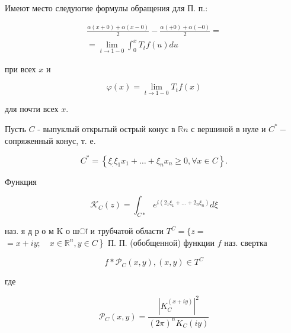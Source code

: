 \documentclass[10pt]{article}
\begin{document}
Имеют место следуюгие формулы обращения для П. п.:



\[

\begin{gathered}

\frac{\alpha(x+0)+\alpha(x-0)}{2}-\frac{\alpha(+0)+\alpha(-0)}{2}= \\

=\lim _{t \rightarrow 1-0} \int_{0}^{x} T_{t} f(u) d u

\end{gathered}

\]



при всех $x$ и



\[

\varphi(x)=\lim _{t \rightarrow 1-0} T_{t} f(x)

\]



для почти всех $x$.



Пусть $C$ - выпуклый открытый острый конус в $\mathbb{R} n$ с вершиной в нуле и $C^{*}-$ сопряженный конус, т. е.



\[

C^{*}=\left\{\xi_{:} \xi_{1} x_{1}+\ldots+\xi_{n} x_{n} \geqslant 0, \forall x \in C\right\} .

\]



Функция



\[

\mathscr{K}_{C}(z)=\int_{C *} e^{i\left(2_{1} \xi_{1}+\ldots+2_{n} \xi_{n}\right)} d \xi

\]



наз. я д р о м $\mathrm{K}$ о шा и трубчатой области $T^{C}=\{z=$ $\left.=x+i y ; \quad x \in \mathbb{R}^{n}, y \in C\right\}$ П. П. (обобщенной) функции $f$ наз. свертка



\[

f * \mathscr{P}_{C}(x, y),(x, y) \in T^{C}

\]



где



\[

\mathscr{P}_{C}(x, y)=\frac{\left|K_{C}^{(x+i y)}\right|^{2}}{(2 \pi)^{n} K_{C}(i y)}

\]
\end{document}
